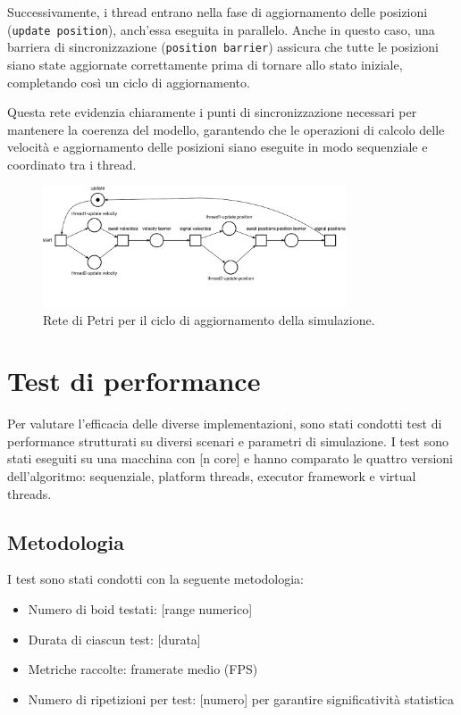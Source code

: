 \documentclass[a4paper,12pt]{report}
\begin{document}
Successivamente, i thread entrano nella fase di aggiornamento delle posizioni (\texttt{update position}), anch'essa eseguita in parallelo. Anche in questo caso, una barriera di sincronizzazione (\texttt{position barrier}) assicura che tutte le posizioni siano state aggiornate correttamente prima di tornare allo stato iniziale, completando così un ciclo di aggiornamento.

Questa rete evidenzia chiaramente i punti di sincronizzazione necessari per mantenere la coerenza del modello, garantendo che le operazioni di calcolo delle velocità e aggiornamento delle posizioni siano eseguite in modo sequenziale e coordinato tra i thread.

\begin{figure}[h!]
    \centering
    \includegraphics[width=0.8\textwidth]{rete_update_cycle.pdf}
    \caption{Rete di Petri per il ciclo di aggiornamento della simulazione.}
    \label{fig:rete_update_cycle}
\end{figure}

\chapter{Test di performance}
Per valutare l'efficacia delle diverse implementazioni, sono stati condotti test di performance strutturati su diversi scenari e parametri di simulazione. I test sono stati eseguiti su una macchina con [n core] e hanno comparato le quattro versioni dell'algoritmo: sequenziale, platform threads, executor framework e virtual threads.

\section{Metodologia}
I test sono stati condotti con la seguente metodologia:
\begin{itemize}
    \item Numero di boid testati: [range numerico]
    \item Durata di ciascun test: [durata]
    \item Metriche raccolte: framerate medio (FPS)
    \item Numero di ripetizioni per test: [numero] per garantire significatività statistica
\end{itemize}
\end{document}

